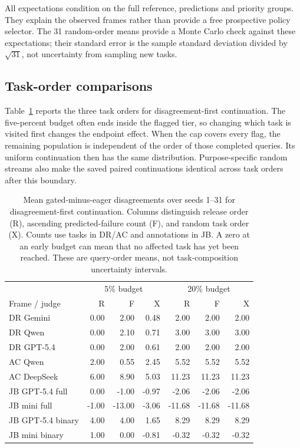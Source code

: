 All expectations condition on the full reference, predictions and priority
groups. They explain the observed frames rather than provide a free
prospective policy selector. The 31 random-order means provide a Monte Carlo
check against these expectations; their standard error is the sample
standard deviation divided by $\sqrt{31}$, not uncertainty from sampling new
tasks.

\subsection{Task-order comparisons}
\label{app:task-orders}

Table~\ref{tab:task-orders} reports the three task orders for
disagreement-first continuation. The five-percent budget often ends inside
the flagged tier, so changing which task is visited first changes the
endpoint effect. When the cap covers every flag, the remaining population
is independent of the order of those completed queries. Its uniform
continuation then has the same distribution. Purpose-specific random
streams also make the saved paired continuations identical across task
orders after this boundary.

\begin{table}[!htbp]
\centering\small
\caption{Mean gated-minus-eager disagreements over seeds 1--31 for
disagreement-first continuation. Columns distinguish release order (R),
ascending predicted-failure count (F), and random task order (X).
Counts use tasks in DR/AC and annotations in JB. A zero at an early budget
can mean that no affected task has yet been reached. These are query-order
means, not task-composition uncertainty intervals.}
\label{tab:task-orders}
\begin{tabular}{lrrrrrr}
\toprule
& \multicolumn{3}{c}{5\% budget} & \multicolumn{3}{c}{20\% budget}\\
Frame / judge & R & F & X & R & F & X\\
\midrule
DR Gemini & 0.00 & 2.00 & 0.48 & 2.00 & 2.00 & 2.00 \\
DR Qwen & 0.00 & 2.10 & 0.71 & 3.00 & 3.00 & 3.00 \\
DR GPT-5.4 & 0.00 & 2.00 & 0.61 & 2.00 & 2.00 & 2.00 \\
AC Qwen & 2.00 & 0.55 & 2.45 & 5.52 & 5.52 & 5.52 \\
AC DeepSeek & 6.00 & 8.90 & 5.03 & 11.23 & 11.23 & 11.23 \\
JB GPT-5.4 full & 0.00 & -1.00 & -0.97 & -2.06 & -2.06 & -2.06 \\
JB mini full & -1.00 & -13.00 & -3.06 & -11.68 & -11.68 & -11.68 \\
JB GPT-5.4 binary & 4.00 & 4.00 & 1.65 & 8.29 & 8.29 & 8.29 \\
JB mini binary & 1.00 & 0.00 & -0.81 & -0.32 & -0.32 & -0.32 \\
\bottomrule
\end{tabular}
\end{table}

